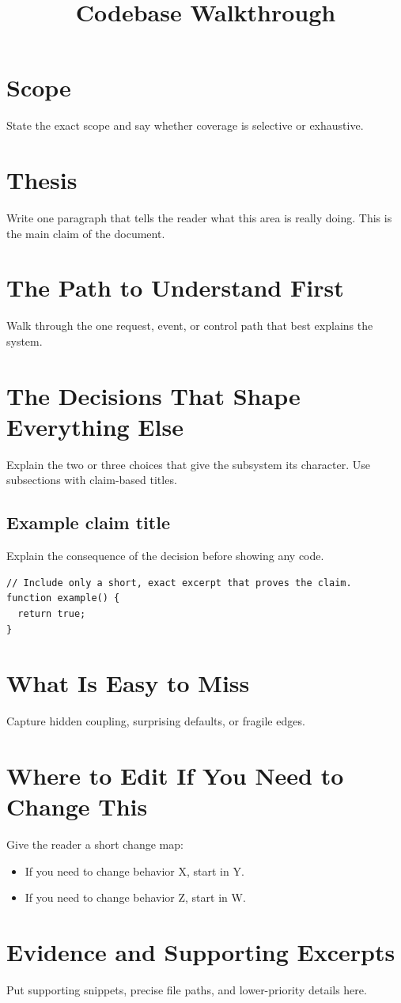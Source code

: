 \documentclass[11pt]{article}
\title{Codebase Walkthrough}
\author{}
\date{}
\begin{document}
\maketitle

\section{Scope}
State the exact scope and say whether coverage is selective or exhaustive.

\section{Thesis}
Write one paragraph that tells the reader what this area is really doing.
This is the main claim of the document.

\section{The Path to Understand First}
Walk through the one request, event, or control path that best explains the system.

\section{The Decisions That Shape Everything Else}
Explain the two or three choices that give the subsystem its character.
Use subsections with claim-based titles.

\subsection{Example claim title}
Explain the consequence of the decision before showing any code.

\lstset{style=codeblock, language=Java}
\begin{lstlisting}
// Include only a short, exact excerpt that proves the claim.
function example() {
  return true;
}
\end{lstlisting}

\section{What Is Easy to Miss}
Capture hidden coupling, surprising defaults, or fragile edges.

\section{Where to Edit If You Need to Change This}
Give the reader a short change map:
\begin{itemize}[leftmargin=1.5em]
  \item If you need to change behavior X, start in Y.
  \item If you need to change behavior Z, start in W.
\end{itemize}

\appendix
\section{Evidence and Supporting Excerpts}
Put supporting snippets, precise file paths, and lower-priority details here.
\end{document}

